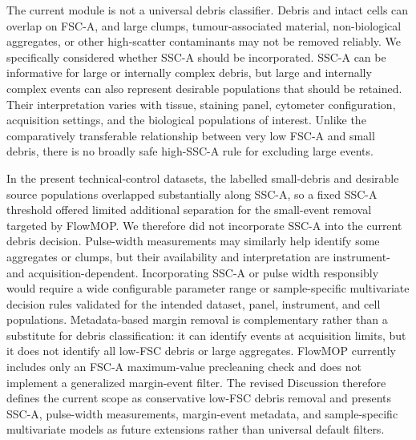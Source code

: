 \documentclass[
  11pt,
  a4paper,
]{article}
\begin{document}
The current module is not a universal debris classifier. Debris and
intact cells can overlap on FSC-A, and large clumps, tumour-associated
material, non-biological aggregates, or other high-scatter contaminants
may not be removed reliably. We specifically considered whether SSC-A
should be incorporated. SSC-A can be informative for large or internally
complex debris, but large and internally complex events can also
represent desirable populations that should be retained. Their
interpretation varies with tissue, staining panel, cytometer
configuration, acquisition settings, and the biological populations of
interest. Unlike the comparatively transferable relationship between
very low FSC-A and small debris, there is no broadly safe high-SSC-A
rule for excluding large events.

In the present technical-control datasets, the labelled small-debris and
desirable source populations overlapped substantially along SSC-A, so a
fixed SSC-A threshold offered limited additional separation for the
small-event removal targeted by FlowMOP. We therefore did not
incorporate SSC-A into the current debris decision. Pulse-width
measurements may similarly help identify some aggregates or clumps, but
their availability and interpretation are instrument- and
acquisition-dependent. Incorporating SSC-A or pulse width responsibly
would require a wide configurable parameter range or sample-specific
multivariate decision rules validated for the intended dataset, panel,
instrument, and cell populations. {\color{revisionblue}Metadata-based
margin removal is complementary rather than a substitute for debris
classification: it can identify events at acquisition limits, but it
does not identify all low-FSC debris or large aggregates. FlowMOP
currently includes only an FSC-A maximum-value precleaning check and
does not implement a generalized margin-event filter.} The revised
Discussion therefore defines the current scope as conservative low-FSC
debris removal and presents SSC-A, pulse-width measurements,
margin-event metadata, and sample-specific multivariate models as future
extensions rather than universal default filters.
\end{document}
